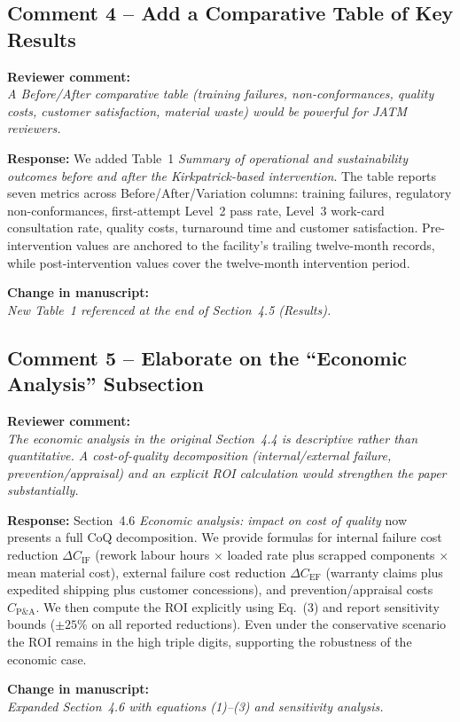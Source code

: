 \documentclass[11pt,a4paper]{article}
\newcommand{\comment}[1]{\par\smallskip\noindent\textbf{\color{blue!60!black}Reviewer comment:}\\ \emph{#1}\par\smallskip}
\newcommand{\response}[1]{\noindent\textbf{Response:} #1\par\smallskip}
\newcommand{\change}[1]{\par\noindent\textbf{\color{green!50!black}Change in manuscript:}\\ \emph{#1}\par\smallskip}
\begin{document}
\subsection*{Comment 4 -- Add a Comparative Table of Key Results}
\comment{A Before/After comparative table (training failures,
non-conformances, quality costs, customer satisfaction, material waste)
would be powerful for JATM reviewers.}

\response{We added Table~1 \emph{Summary of operational and sustainability
outcomes before and after the Kirkpatrick-based intervention}. The table
reports seven metrics across Before/After/Variation columns: training
failures, regulatory non-conformances, first-attempt Level~2 pass rate,
Level~3 work-card consultation rate, quality costs, turnaround time and
customer satisfaction. Pre-intervention values are anchored to the
facility's trailing twelve-month records, while post-intervention values
cover the twelve-month intervention period.}

\change{New Table~1 referenced at the end of Section~4.5 (Results).}

\subsection*{Comment 5 -- Elaborate on the ``Economic Analysis'' Subsection}
\comment{The economic analysis in the original Section~4.4 is descriptive
rather than quantitative. A cost-of-quality decomposition (internal/external
failure, prevention/appraisal) and an explicit ROI calculation would
strengthen the paper substantially.}

\response{Section~4.6 \emph{Economic analysis: impact on cost of quality}
now presents a full CoQ decomposition. We provide formulas for internal
failure cost reduction $\Delta C_{\text{IF}}$ (rework labour hours $\times$
loaded rate plus scrapped components $\times$ mean material cost), external
failure cost reduction $\Delta C_{\text{EF}}$ (warranty claims plus
expedited shipping plus customer concessions), and prevention/appraisal
costs $C_{\text{P\&A}}$. We then compute the ROI explicitly using
Eq.~(3) and report sensitivity bounds ($\pm 25\%$ on all reported
reductions). Even under the conservative scenario the ROI remains in the
high triple digits, supporting the robustness of the economic case.}

\change{Expanded Section~4.6 with equations (1)--(3) and sensitivity
analysis.}
\end{document}

